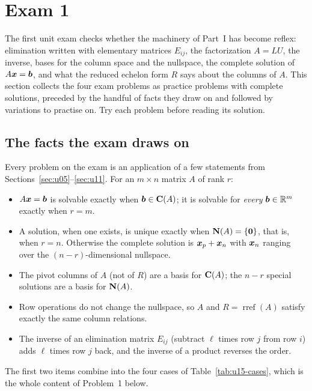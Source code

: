 \section{Exam 1}\label{sec:u15}

The first unit exam checks whether the machinery of Part~I has become reflex: elimination
written with elementary matrices $E_{ij}$, the factorization $A=LU$, the inverse, bases for
the column space and the nullspace, the complete solution of $A\boldsymbol{x}=\boldsymbol{b}$, and what the
reduced echelon form $R$ says about the columns of $A$. This section collects the four exam
problems as practice problems with complete solutions, preceded by the handful of facts they
draw on and followed by variations to practise on. Try each problem before reading its solution.

\subsection{The facts the exam draws on}

Every problem on the exam is an application of a few statements from
Sections~\ref{sec:u05}--\ref{sec:u11}. For an $m\times n$ matrix $A$ of rank $r$:
\begin{itemize}
  \item $A\boldsymbol{x}=\boldsymbol{b}$ is solvable exactly when $\boldsymbol{b}\in\mathbf{C}(A)$; it is solvable for
    \emph{every} $\boldsymbol{b}\in\mathbb{R}^m$ exactly when $r=m$.
  \item A solution, when one exists, is unique exactly when $\mathbf{N}(A)=\{\boldsymbol{0}\}$, that is,
    when $r=n$. Otherwise the complete solution is $\boldsymbol{x}_p+\boldsymbol{x}_n$ with $\boldsymbol{x}_n$ ranging
    over the $(n-r)$-dimensional nullspace.
  \item The pivot columns of $A$ (not of $R$) are a basis for $\mathbf{C}(A)$; the $n-r$ special
    solutions are a basis for $\mathbf{N}(A)$.
  \item Row operations do not change the nullspace, so $A$ and $R=\operatorname{rref}(A)$
    satisfy exactly the same column relations.
  \item The inverse of an elimination matrix $E_{ij}$ (subtract $\ell$ times row $j$ from row
    $i$) adds $\ell$ times row $j$ back, and the inverse of a product reverses the order.
\end{itemize}
The first two items combine into the four cases of Table~\ref{tab:u15-cases}, which is the
whole content of Problem~1 below.

